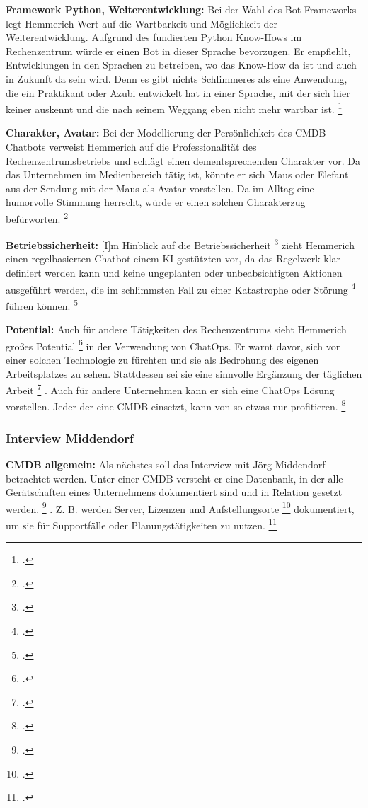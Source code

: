 \textbf{Framework Python, Weiterentwicklung: }Bei der Wahl des Bot-Frameworks legt Hemmerich Wert auf die Wartbarkeit und Möglichkeit der Weiterentwicklung. Aufgrund des fundierten Python Know-Hows im Rechenzentrum würde er einen Bot in dieser Sprache bevorzugen. Er empfiehlt, \glqq{}Entwicklungen in den Sprachen zu betreiben, wo das Know-How da ist und auch in Zukunft da sein wird. Denn es gibt nichts Schlimmeres als eine Anwendung, die ein Praktikant oder Azubi entwickelt hat in einer Sprache, mit der sich hier keiner auskennt und die nach seinem Weggang eben nicht mehr wartbar ist.\grqq
\footcites[][o. \pno]{Hemm_2019}[Vgl.][o. \pno]{Hemm_2019}

\textbf{Charakter, Avatar: }Bei der Modellierung der Persönlichkeit des \acs{CMDB} Chatbots verweist Hemmerich auf die Professionalität des Rechenzentrumsbetriebs und schlägt einen dementsprechenden Charakter vor. Da das Unternehmen im Medienbereich tätig ist, könnte er sich Maus oder Elefant aus der Sendung mit der Maus als Avatar vorstellen. Da im Alltag eine humorvolle Stimmung herrscht, würde er einen solchen Charakterzug befürworten.  
\footcite[Vgl.][o. \pno]{Hemm_2019}

\textbf{Betriebssicherheit: }\glqq{}[I]m Hinblick auf die Betriebssicherheit\grqq
\footcite[][o. \pno]{Hemm_2019}
zieht Hemmerich einen regelbasierten Chatbot einem KI-gestützten vor, da das Regelwerk klar definiert werden kann und keine ungeplanten oder unbeabsichtigten Aktionen ausgeführt werden, die im schlimmsten Fall zu \glqq{}einer Katastrophe oder Störung\grqq 
\footcite[][o. \pno]{Hemm_2019}
 führen können. 
\footcite[Vgl.][o. \pno]{Hemm_2019}

\textbf{Potential: }Auch für andere Tätigkeiten des Rechenzentrums sieht Hemmerich \glqq{}großes Potential\grqq
\footcite[][o. \pno]{Hemm_2019}
 in der Verwendung von ChatOps.
 Er warnt davor, sich vor einer solchen Technologie zu fürchten und sie als Bedrohung des eigenen Arbeitsplatzes zu sehen. Stattdessen sei sie eine \glqq{}sinnvolle Ergänzung der täglichen Arbeit\grqq
\footcite[][o. \pno]{Hemm_2019}
. Auch für andere Unternehmen kann er sich eine ChatOps Lösung vorstellen. \glqq{}Jeder der eine CMDB einsetzt, kann von so etwas nur profitieren.\grqq
\footcites[][o. \pno]{Hemm_2019}[Vgl.][o. \pno]{Hemm_2019}



\subsubsection{Interview Middendorf}
\textbf{CMDB allgemein: }Als nächstes soll das Interview mit Jörg Middendorf betrachtet werden. Unter einer \acs{CMDB} versteht er eine Datenbank, in der \glqq{}alle Gerätschaften eines Unternehmens dokumentiert sind und in Relation gesetzt werden\grqq.
\footcite[][o. \pno]{Midd_2019}
.
Z. B. werden \glqq{}Server, Lizenzen und Aufstellungsorte\grqq
\footcite[][o. \pno]{Midd_2019}
 dokumentiert, um sie für Supportfälle oder Planungstätigkeiten zu nutzen.
\footcite[Vgl.][o. \pno]{Midd_2019}

